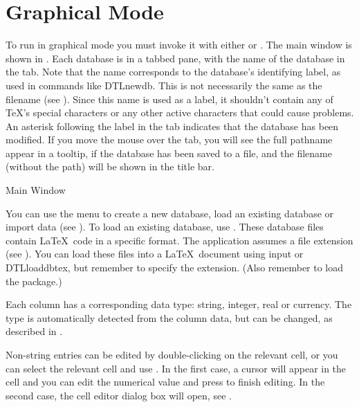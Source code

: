 \chapter{Graphical Mode}\label{sec:gui}

To run  in graphical mode you must invoke it with either 
 or . The main window
is shown in . Each database is
in a tabbed pane, with the name of the database in the
tab. Note that the name corresponds to the database's identifying
label, as used in commands like \gls{DTLnewdb}. This is 
not necessarily the same as the filename (see ). 
Since this name is used as a label, it shouldn't contain any of 
\TeX's special characters or any other active characters that could 
cause problems.  An asterisk \code{*} following the label in the tab 
indicates that the database has been modified. If you move the mouse
over the tab, you will see the full pathname appear in a tooltip,
if the database has been saved to a  file,
and the filename (without the path) will be shown in the title bar.

 {%
 }
 {Main Window}

 You can use the  menu to create a new 
database, load an existing database or import data (see 
). To load an existing database, use
. These database files contain \LaTeX\ code
in a specific format. The  application assumes 
a  file extension (see ).
You can load these files into a \LaTeX\ document using 
\gls{input} or \gls{DTLloaddbtex}, but remember to specify 
the  extension. (Also remember to load the 
 package.)

Each column has a corresponding data type: string, integer, real
or currency. The type is automatically detected from the column data,
but can be changed, as described in .

Non-string entries can be edited by double-clicking on the relevant cell, 
or you can select the relevant cell and use .
In the first case, a cursor will appear in the cell and you 
can edit the numerical value and press  to finish 
editing. In the second case, the cell editor dialog box will 
open, see .

